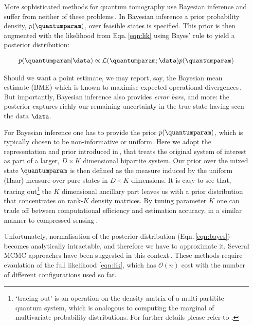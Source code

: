 More sophisticated methods for quantum tomography use Bayesian inference and suffer from neither of these problems\,\cite[][and refs.]{BayesianTomography}. In Bayesian inference a prior probability density, $p(\quantumparam)$, over feasible states is specified. This prior is then augmented with the likelihood from Eqn.\,\eqref{eqn:lik} using Bayes' rule to yield a posterior distribution:

\begin{equation}
	\label{eqn:bayes}
	p(\quantumparam\vert\data)\propto \mathcal{L}(\quantumparam;\data)p(\quantumparam)
\end{equation}

Should we want a point estimate, we may report, say, the Bayesian mean estimate (BME) which is known to maximise expected operational divergences\,\citep{BayesianTomography,BayesianOptimality}. But importantly, Bayesian inference also provides \emph{error bars}, and more: the posterior captures richly our remaining uncertainty in the true state having seen the data $\data$. 

For Bayesian inference one has to provide the prior $p(\quantumparam)$, which is typically chosen to be non-informative or uniform. Here we adopt the representation and prior introduced in\,\citep{BayesianTomography}, that treats the original system of interest as part of a larger, $D \times K$ dimensional bipartite system. Our prior over the mixed state $\quantumparam$ is then defined as the measure induced by the uniform (Haar) measure over pure states in $D\times K$ dimensions. It is easy to see that, tracing out\footnote{`tracing out' is an operation on the density matrix of a multi-partitite quantum system, which is analogous to computing the marginal of multivariate probability distributions. For further details please refer to \citep{BayesianTomography}.} the $K$ dimensional ancillary part leaves us with a prior distribution that concentrates on rank-$K$ density matrices. By tuning parameter $K$ one can trade off between computational efficiency and estimation accuracy, in a similar manner to compressed sensing\,\citep{CompressedSensing}.

Unfortunately, normalisation of the posterior distribution (Eqn.\,\eqref{eqn:bayes}) becomes analytically intractable, and therefore we have to approximate it. Several MCMC approaches have been suggested in this context\,\cite[][and refs.\ therein]{BayesianTomography}. These methods require evaulation of the full likelihood \eqref{eqn:lik}, which has $\mathcal{O}(n)$ cost with the number of different configurations used so far.

